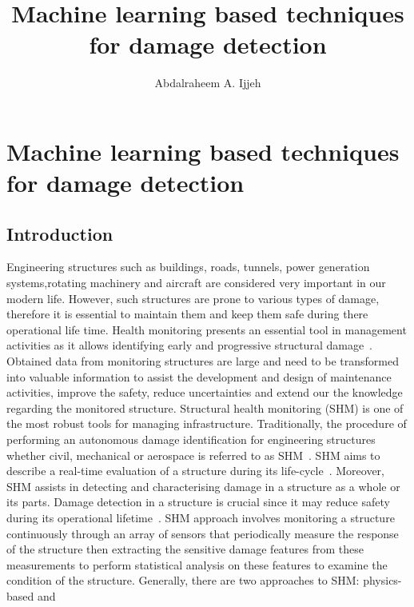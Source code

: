 \documentclass[b5paper, 11pt, openany, titlepage]{book}
\begin{document}


\title{Machine learning based techniques for damage detection}
\author{Abdalraheem A. Ijjeh}
\maketitle
\tableofcontents
\chapter[ML techniques for damage detection]{Machine learning based techniques for damage detection}
\section{Introduction}
Engineering structures such as buildings, roads, tunnels, power generation systems,rotating machinery and aircraft are considered very important in our modern life.
However, such structures are prone to various types of damage, therefore it is essential to maintain them and keep them safe during there operational life time.
Health monitoring presents an essential tool in management activities as it allows identifying early and progressive structural damage~\cite{farrar2007introduction}. 
Obtained data from monitoring structures are large and need to be transformed into valuable information to assist the development and design of maintenance activities, improve the safety, reduce uncertainties and extend our the knowledge regarding the monitored structure.
Structural health monitoring (SHM) is one of the most robust
tools for managing infrastructure.
Traditionally, the procedure of performing an autonomous damage identification for engineering structures whether civil, mechanical or aerospace is referred to as SHM~\cite{farrar2001vibration}.
SHM aims to describe a real-time evaluation of a structure during its life-cycle~\cite{Balageas2010}. 
Moreover, SHM assists in detecting and characterising damage in a structure as a whole or its parts. 
Damage detection in a structure is crucial since it may reduce safety during its operational lifetime~\cite{Yuan2016}.
SHM approach involves monitoring a structure continuously through an array of sensors that periodically measure the response of the structure then extracting the sensitive damage features from these measurements
to perform statistical analysis on these features to examine the condition of the structure.
Generally, there are two approaches to SHM: physics-based and
\end{document}
